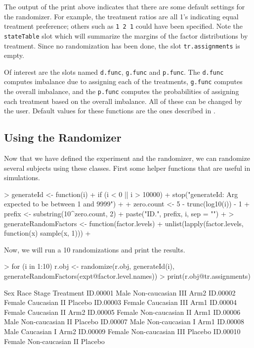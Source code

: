 \documentclass[11pt, letter]{article}
\numberwithin{equation}{section}
\begin{document}
The output of the print above indicates that there are some default
settings for the randomizer. For example, the treatment ratios are all
1's indicating equal treatment preference; others such as \texttt{1 2
  1} could have been specified. Note the \texttt{stateTable} slot
which will summarize the margins of the factor distributions by
treatment. Since no randomization has been done, the slot
\texttt{tr.assignments} is empty. 

Of interest are the slots named \texttt{d.func}, \texttt{g.func} and
\texttt{p.func}. The \texttt{d.func} computes
imbalance due to assigning each of the treatments, \texttt{g.func}
computes the overall imbalance, and the \texttt{p.func} computes the
probabilities of assigning each treatment based on the overall
imbalance. All of these can be changed by the user. Default values for
these functions are the ones described in \cite{ps:1975}. 

\subsection{Using the Randomizer}
\label{sec:using}

Now that we have defined the experiment and the randomizer, we can
randomize several subjects using these classes. First some helper
functions that are useful in simulations.

\begin{Schunk}
\begin{Sinput}
> generateId <- function(i) {
+     if (i < 0 || i > 10000) {
+         stop("generateId: Arg expected to be between 1 and 9999")
+     }
+     zero.count <- 5 - trunc(log10(i)) - 1
+     prefix <- substring(10^zero.count, 2)
+     paste("ID.", prefix, i, sep = "")
+ }
> generateRandomFactors <- function(factor.levels) {
+     unlist(lapply(factor.levels, function(x) sample(x, 1)))
+ }
\end{Sinput}
\end{Schunk}

Now, we will run a 10 randomizations and print the results.

\begin{Schunk}
\begin{Sinput}
> for (i in 1:10) r.obj <- randomize(r.obj, generateId(i), generateRandomFactors(expt@factor.level.names))
> print(r.obj@tr.assignments)
\end{Sinput}
\begin{Soutput}
            Sex          Race Stage Treatment
ID.00001   Male Non-caucasian   III      Arm2
ID.00002 Female     Caucasian    II   Placebo
ID.00003 Female     Caucasian   III      Arm1
ID.00004 Female     Caucasian    II      Arm2
ID.00005 Female Non-caucasian    II      Arm1
ID.00006   Male Non-caucasian    II   Placebo
ID.00007   Male Non-caucasian     I      Arm1
ID.00008   Male     Caucasian     I      Arm2
ID.00009 Female Non-caucasian   III   Placebo
ID.00010 Female Non-caucasian    II   Placebo
\end{Soutput}
\end{Schunk}
\end{document}
